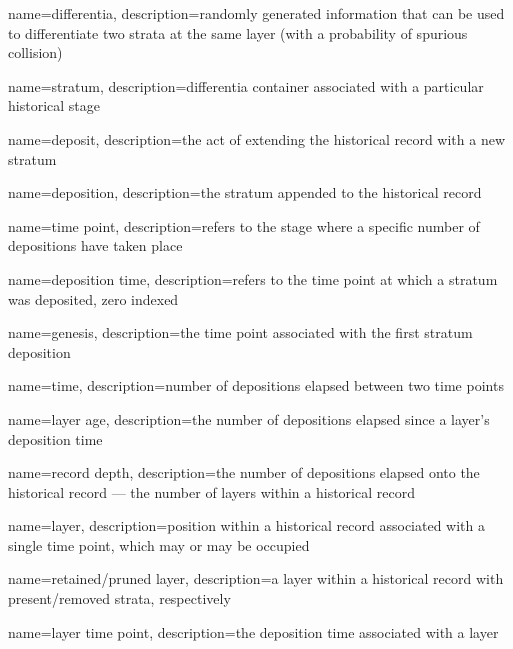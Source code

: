 
\makeglossaries






{
    name=differentia,
    description={randomly generated information that can be used to differentiate two strata at the same layer (with a probability of spurious collision)}
}

{
    name=stratum,
    description={differentia container associated with a particular historical stage}
}

{
    name=deposit,
    description={the act of extending the historical record with a new stratum}
}

{
    name=deposition,
    description={the stratum appended to the historical record}
}

{
    name=time point,
    description={refers to the stage where a specific number of depositions have taken place}
}

{
    name=deposition time,
    description={refers to the time point at which a stratum was deposited, zero indexed}
}

{
    name=genesis,
    description={the time point associated with the first stratum deposition}
}

{
    name=time,
    description={number of depositions elapsed between two time points}
}

{
    name=layer age,
    description={the number of depositions elapsed since a layer's deposition time}
}

{
    name=record depth,
    description={the number of depositions elapsed onto the historical record --- the number of layers within a historical record}
}

{
    name=layer,
    description={position within a historical record associated with a single time point, which may or may be occupied}
}

{
    name=retained/pruned layer,
    description={a layer within a historical record with present/removed strata, respectively}
}

{
    name=layer time point,
    description={the deposition time associated with a layer}
}

